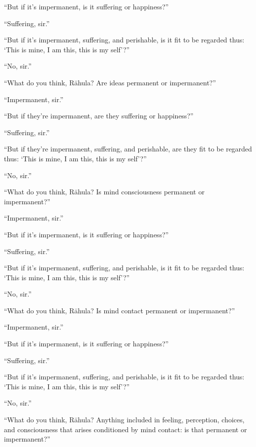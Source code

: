 \documentclass[12pt,openany]{book}%
\begin{document}
“But if it’s impermanent, is it suffering or happiness?” 

“Suffering, sir.” 

“But if it’s impermanent, suffering, and perishable, is it fit to be regarded thus: ‘This is mine, I am this, this is my self’?” 

“No, sir.” 

“What do you think, \textsanskrit{Rāhula}? Are ideas permanent or impermanent?” 

“Impermanent, sir.” 

“But if they're impermanent, are they suffering or happiness?” 

“Suffering, sir.” 

“But if they're impermanent, suffering, and perishable, are they fit to be regarded thus: ‘This is mine, I am this, this is my self’?” 

“No, sir.” 

“What do you think, \textsanskrit{Rāhula}? Is mind consciousness permanent or impermanent?” 

“Impermanent, sir.” 

“But if it’s impermanent, is it suffering or happiness?” 

“Suffering, sir.” 

“But if it’s impermanent, suffering, and perishable, is it fit to be regarded thus: ‘This is mine, I am this, this is my self’?” 

“No, sir.” 

“What do you think, \textsanskrit{Rāhula}? Is mind contact permanent or impermanent?” 

“Impermanent, sir.” 

“But if it’s impermanent, is it suffering or happiness?” 

“Suffering, sir.” 

“But if it’s impermanent, suffering, and perishable, is it fit to be regarded thus: ‘This is mine, I am this, this is my self’?” 

“No, sir.” 

“What do you think, \textsanskrit{Rāhula}? Anything included in feeling, perception, choices, and consciousness that arises conditioned by mind contact: is that permanent or impermanent?” 
\end{document}
